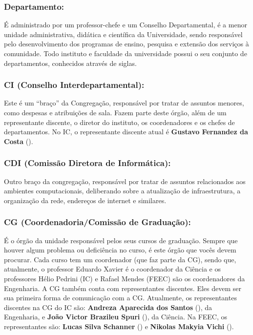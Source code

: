 \subsubsection{Departamento:} É administrado por um professor-chefe e um
Conselho Departamental, é a menor unidade administrativa, didática e científica
da Universidade, sendo responsável pelo desenvolvimento dos programas de ensino,
pesquisa e extensão dos serviços à comunidade. Todo instituto e faculdade da
universidade possui o seu conjunto de departamentos, conhecidos através de
siglas.

\subsubsection{CI (Conselho Interdepartamental):} Este é um ``braço'' da
Congregação, responsável por tratar de assuntos menores, como despesas e
atribuições de sala. Fazem parte deste órgão, além de um representante discente,
o diretor do instituto, os coordenadores e os chefes de departamentos. No IC, o
representante discente atual é \textbf{Gustavo Fernandez da Costa}
().

\subsubsection{CDI (Comissão Diretora de Informática):} Outro braço da
congregação, responsável por tratar de assuntos relacionados aos ambientes
computacionais, deliberando sobre a atualização de infraestrutura, a organização
da rede, endereços de internet e similares.

\subsubsection{CG (Coordenadoria/Comissão de Graduação):} É o órgão da unidade
responsável pelos seus cursos de graduação. Sempre que houver algum problema ou
deficiência no curso, é este órgão que vocês devem procurar.  Cada curso tem um
coordenador (que faz parte da CG), sendo que, atualmente, o professor Eduardo
Xavier é o coordenador da Ciência e os professores Hélio Pedrini (IC) e Rafael
Mendes (FEEC) são os coordenadores da Engenharia. A CG também conta com
representantes discentes. Eles devem ser sua primeira forma de comunicação 
com a CG.  Atualmente, os representantes discentes na CG do IC são: 
\textbf{Andreza Aparecida dos Santos} (), da 
Engenharia, e \textbf{João Victor Brazileu Spuri} 
(), da Ciência.  Na FEEC, os 
representantes são: \textbf{Lucas Silva Schanner} 
() e \textbf{Nikolas Makyia Vichi} 
().

